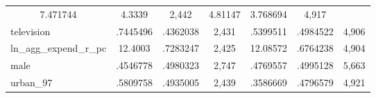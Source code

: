 \begin{table}[!h]
\begin{tabular}{lllllll}
  \multicolumn{1}{|c}{7.471744} &
  \multicolumn{1}{c}{4.3339} &
  \multicolumn{1}{c}{2,442} &
  \multicolumn{1}{c}{4.81147} &
  \multicolumn{1}{c}{3.768694} &
  \multicolumn{1}{c}{4,917} \\
\multicolumn{1}{l}{television} &
  \multicolumn{1}{|c}{.7445496} &
  \multicolumn{1}{c}{.4362038} &
  \multicolumn{1}{c}{2,431} &
  \multicolumn{1}{c}{.5399511} &
  \multicolumn{1}{c}{.4984522} &
  \multicolumn{1}{c}{4,906} \\
\multicolumn{1}{l}{ln\_agg\_expend\_r\_pc} &
  \multicolumn{1}{|c}{12.4003} &
  \multicolumn{1}{c}{.7283247} &
  \multicolumn{1}{c}{2,425} &
  \multicolumn{1}{c}{12.08572} &
  \multicolumn{1}{c}{.6764238} &
  \multicolumn{1}{c}{4,904} \\
\multicolumn{1}{l}{male} &
  \multicolumn{1}{|c}{.4546778} &
  \multicolumn{1}{c}{.4980323} &
  \multicolumn{1}{c}{2,747} &
  \multicolumn{1}{c}{.4769557} &
  \multicolumn{1}{c}{.4995128} &
  \multicolumn{1}{c}{5,663} \\
\multicolumn{1}{l}{urban\_97} &
  \multicolumn{1}{|c}{.5809758} &
  \multicolumn{1}{c}{.4935005} &
  \multicolumn{1}{c}{2,439} &
  \multicolumn{1}{c}{.3586669} &
  \multicolumn{1}{c}{.4796579} &
  \multicolumn{1}{c}{4,921} \\
\cline{1-7}
\end{tabular}
\end{table}
